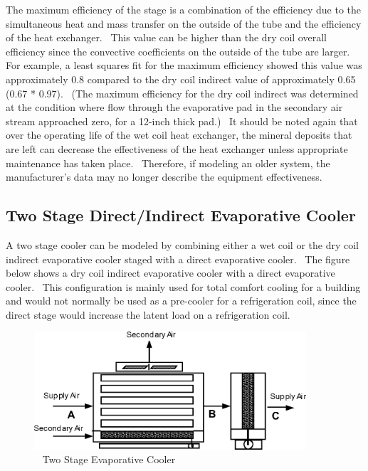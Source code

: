 The maximum efficiency of the stage is a combination of the efficiency due to the simultaneous heat and mass transfer on the outside of the tube and the efficiency of the heat exchanger.~ This value can be higher than the dry coil overall efficiency since the convective coefficients on the outside of the tube are larger.~ For example, a least squares fit for the maximum efficiency showed this value was approximately 0.8 compared to the dry coil indirect value of approximately 0.65 (0.67 * 0.97).~ (The maximum efficiency for the dry coil indirect was determined at the condition where flow through the evaporative pad in the secondary air stream approached zero, for a 12-inch thick pad.)~ It should be noted again that over the operating life of the wet coil heat exchanger, the mineral deposits that are left can decrease the effectiveness of the heat exchanger unless appropriate maintenance has taken place.~ Therefore, if modeling an older system, the manufacturer's data may no longer describe the equipment effectiveness.

\subsection{Two Stage Direct/Indirect Evaporative Cooler}\label{two-stage-directindirect-evaporative-cooler}

A two stage cooler can be modeled by combining either a wet coil or the dry coil indirect evaporative cooler staged with a direct evaporative cooler.~ The figure below shows a dry coil indirect evaporative cooler with a direct evaporative cooler.~ This configuration is mainly used for total comfort cooling for a building and would not normally be used as a pre-cooler for a refrigeration coil, since the direct stage would increase the latent load on a refrigeration coil.

\begin{figure}[hbtp] %
\centering
\includegraphics[width=0.9\textwidth, height=0.9\textheight, keepaspectratio=true]{media/image4806.png}
\caption{  Two Stage Evaporative Cooler \protect \label{fig:two-stage-evaporative-cooler}}
\end{figure}

